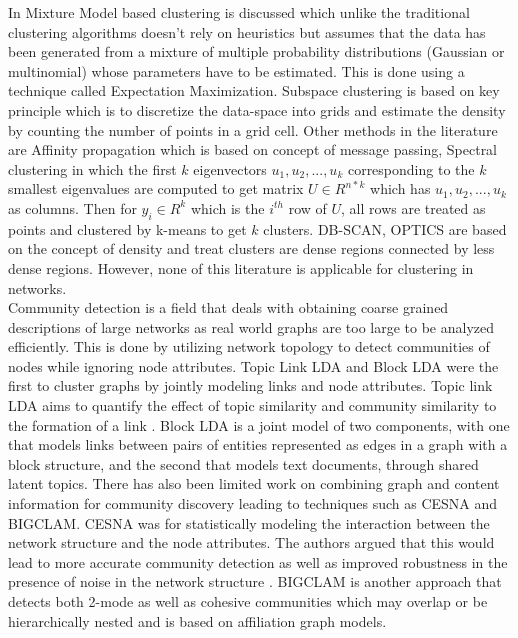 In \cite{aps:45} Mixture Model based clustering is discussed which
unlike the traditional clustering algorithms doesn't rely on
heuristics but assumes that the data has been generated from
a mixture of multiple probability distributions (Gaussian or
multinomial) whose parameters have
to be estimated. This is done using a technique called Expectation Maximization. Subspace clustering \cite{aps:2} \cite{aps:4} is based on key principle which
is to discretize the data-space into grids and estimate the
density by counting the number of points in a grid cell. Other
methods in the literature are Affinity propagation \cite{aps:3} which is based on concept of message passing, Spectral clustering \cite{aps:2}
in which the ﬁrst $k$ eigenvectors $u_1,u_2,...,u_k$ corresponding to the $k$ smallest eigenvalues are computed to get matrix $U \in R^{n*k}$ which has $u_1,u_2,...,u_k$ as columns. Then for $y_i \in R^k$ which is the $i^{th}$ row of $U$, all rows are treated as points and clustered by k-means to get $k$ clusters. DB-SCAN,
OPTICS are based on the concept of density and treat clusters
are dense regions connected by less dense regions. However, none of this literature is applicable for clustering in networks.\\

Community detection is a field that deals with
obtaining coarse grained descriptions of large networks as real
world graphs are too large to be analyzed efficiently. 
This is done by utilizing network topology to detect communities
of nodes while ignoring node attributes. Topic Link LDA and Block LDA were the first to cluster graphs by jointly modeling links and node attributes. Topic
link LDA aims to quantify the effect of topic similarity
and community similarity to the formation of a link \cite{aps:52} \cite{aps:51}.
Block LDA is a joint model of two components, with one
that models links between pairs of entities represented as
edges in a graph with a block structure, and the second that
models text documents, through shared latent topics. There
has also been limited work on combining graph and content
information for community discovery leading to techniques
such as CESNA and BIGCLAM. CESNA was for statistically
modeling the interaction between the network structure
and the node attributes. The authors argued that this
would lead to more accurate community detection as well as
improved robustness in the presence of noise in the network
structure \cite{aps:53}. BIGCLAM is another approach that detects
both 2-mode as well as cohesive communities which may
overlap or be hierarchically nested and is based on affiliation
graph models.\\

